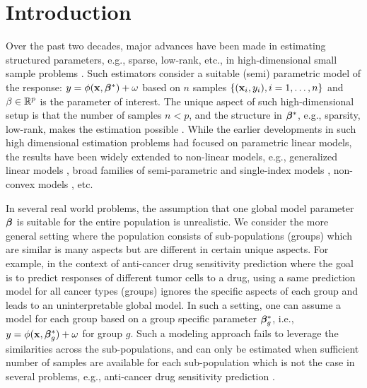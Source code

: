 
\section{Introduction}
Over the past two decades, major advances have been made in estimating structured parameters, e.g., sparse, low-rank, etc., in high-dimensional small sample problems \cite{donoho2006compressed,candes2010power,friedman2008sparse}.
Such estimators consider a suitable (semi) parametric model of the response: $y = \phi(\mathbf{x},\boldsymbol{\beta}^*) + \omega$ based on $n$ samples $\{(\mathbf{x}_i,y_i),i=1,\ldots,n\}$ and $\beta \in \mathbb R^p$
is the parameter of interest. The unique aspect of such high-dimensional setup is that the number of samples $n < p$, and the structure in $\boldsymbol{\beta}^*$, e.g., sparsity, low-rank, makes
the estimation possible \cite{tibshirani1996regression,candes2006robust,candes2009exact}. While the earlier developments in such high dimensional estimation problems had focused on parametric linear models, the results
have been widely extended to non-linear models, e.g., generalized linear models \cite{negahban2009unified,bach2012optimization}, broad families of semi-parametric and single-index models \cite{plan2017high,boufounos20081}, non-convex models \cite{blumensath2009iterative,jain2013low}, etc.

In several real world problems, the assumption that one global model parameter $\boldsymbol{\beta}$ is suitable for the entire population is unrealistic.
We consider the more general setting where the population consists of sub-populations (groups) which are similar is many aspects but are different in certain
unique aspects. For example, in the context of anti-cancer drug sensitivity prediction where the goal is to predict responses of different tumor cells to a drug, using a same prediction model for all cancer types (groups) ignores the specific aspects of each group and leads to an uninterpretable global model. 
%
%
In such a setting, one can assume a model for each group based on a group specific parameter $\boldsymbol{\beta}^*_g$, i.e., $y = \phi(\mathbf{x}, \boldsymbol{\beta}_g^*) + \omega$ for group $g$. 
Such a modeling approach fails to leverage the similarities across the sub-populations, and can only be estimated when sufficient number of samples are available 
for each sub-population which is not the case in several problems, e.g., anti-cancer drug sensitivity prediction \cite{barretina2012cancer, iorio2016landscape1}.
%


